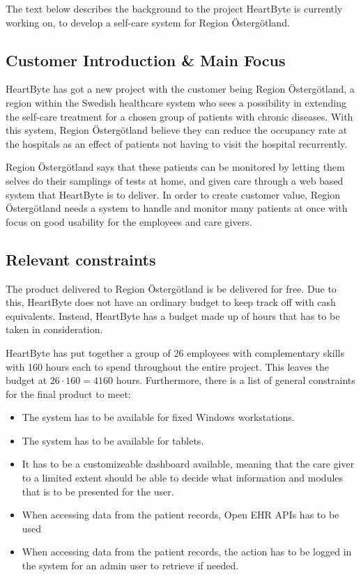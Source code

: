 \setlength{\parindent}{0pt}
The text below describes the background to the project HeartByte is currently working on, to develop a self-care system for Region Östergötland.

\subsection{Customer Introduction \& Main Focus}
HeartByte has got a new project with the customer being Region Östergötland, a region within the Swedish healthcare system who sees a possibility in extending the self-care treatment for a chosen group of patients with chronic diseases. With this system, Region Östergötland believe they can reduce the occupancy rate at the hospitals as an effect of patients not having to visit the hospital recurrently. \vspace{5mm}

Region Östergötland says that these patients can be monitored by letting them selves do their samplings of tests at home, and given care through a web based system that HeartByte is to deliver. In order to create customer value, Region Östergötland needs a system to handle and monitor many patients at once with focus on good usability for the employees and care givers.

\subsection{Relevant constraints}
The product delivered to Region Östergötland is be delivered for free. Due to this, HeartByte does not have an ordinary budget to keep track off with cash equivalents. Instead, HeartByte has a budget made up of hours that has to be taken in consideration. \vspace{5mm}

HeartByte has put together a group of 26 employees with complementary skills with 160 hours each to spend throughout the entire project. This leaves the budget at $26 \cdot 160 = 4160$ hours. Furthermore, there is a list of general constraints for the final product to meet:

\begin{itemize}
    \item The system has to be available for fixed Windows workstations.
    \item The system has to be available for tablets. 
    \item It has to be a customizeable dashboard available, meaning that the care giver to a limited extent should be able to decide what information and modules that is to be presented for the user.  
    \item When accessing data from the patient records, Open EHR APIs has to be used
    \item When accessing data from the patient records, the action has to be logged in the system for an admin user to retrieve if needed.
\end{itemize}

